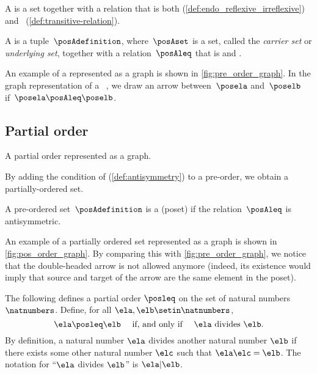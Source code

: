 A  is a set together with a relation that is both  (\cref{def:endo_reflexive_irreflexive}) and ~(\cref{def:transitive-relation}).
\begin{ctdefinition}
    \label{def:preorder}
    A  is a tuple~$\posAdefinition$, where~$\posAset$ is a set, called the \emph{carrier set} or \emph{underlying set}, together with a relation~$\posAleq$ that is
     and .
\end{ctdefinition}
An example of a  represented as a graph is shown in \cref{fig:pre_order_graph}.
In the graph representation of a ~\posA, we draw an arrow between~$\posela$ and~$\poselb$ if~$\posela \posAleq \poselb$.


\vfill

\subsection{Partial order}

\begin{marginfigure}
    \centering
    \caption{A partial order represented as a graph.}
    \label{fig:pos_order_graph}
\end{marginfigure}
By adding the condition of \emph{} (\cref{def:antisymmetry}) to a pre-order, we obtain a partially-ordered set.

\begin{ctdefinition}
    \label{def:poset}
    A pre-ordered set~$\posAdefinition$ is a  (poset) if the relation~$\posAleq$ is antisymmetric.
\end{ctdefinition}

An example of a partially ordered set represented as a graph is shown in \cref{fig:pos_order_graph}.
By comparing this with \cref{fig:pre_order_graph}, we notice that the double-headed arrow is not allowed anymore (indeed, its existence would imply that source and target of the arrow are the same element in the poset).


\begin{example}
    The following defines a partial order $\posleq$ on the set of natural numbers $\natnumbers$.
    Define, for all $\ela, \elb \setin \natnumbers$,
    \begin{equation}
        \ela \posleq \elb \quad \text{ if, and only if } \quad \ela \text{ divides } \elb.
    \end{equation}
    By definition, a natural number $\ela$ divides another natural number $\elb$ if there exists some other natural number $\elc$ such that $\ela \elc = \elb$.
    The notation for ``$\ela$ divides $\elb$'' is $\ela \vert \elb$.

\end{example}

